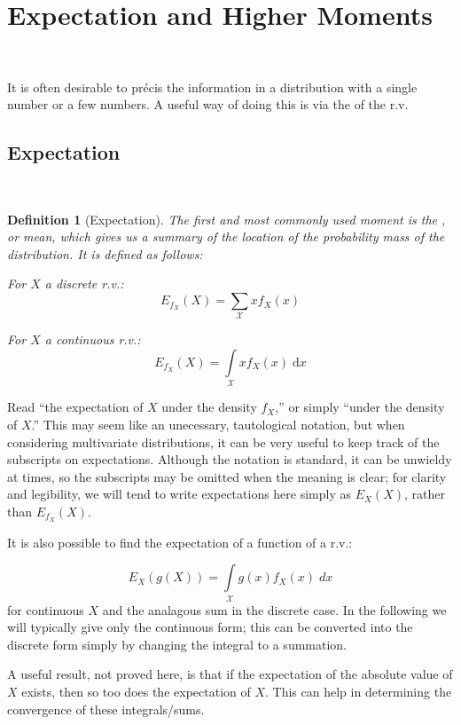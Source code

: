 \documentclass[12pt,a4paper]{article}
\newtheorem{defn}[thm]{Definition}
\newcommand{\uline}[1]{\underline{\smash{#1}}}
\begin{document}
\clearpage
\section{Expectation and Higher Moments}$\;$

It is often desirable to pr\'ecis the information in a distribution with a single number or a few numbers. A useful way of doing this is via the \uline{moments} of the r.v.

\subsection{Expectation}$\;$

\begin{defn}[Expectation]
\vspace{1cm}

The first and most commonly used moment is the \uline{expectation}, or mean, which gives us a summary of the location of the probability mass of the distribution. It is defined as follows:\par
\vspace{1cm}
\noindent For $X$ a discrete r.v.:
$$E_{f_X}(X) = \sum_{\mathcal{X}}x f_X(x)$$

\noindent For $X$ a continuous r.v.:
$$E_{f_X}(X) = \int\limits_{\mathcal{X}} x f_X(x)\; \mathrm{d}x$$

\end{defn}

Read ``the expectation of $X$ under the density $f_X$,'' or simply ``under the density of $X$.'' This may seem like an unecessary, tautological notation, but when considering multivariate distributions, it can be very useful to keep track of the subscripts on expectations. Although the notation is standard, it can be unwieldy at times, so the subscripts may be omitted when the meaning is clear; for clarity and legibility, we will tend to write expectations here simply as $E_X(X)$, rather than $E_{f_X}(X)$.

It is also possible to find the expectation of a function of a r.v.:

$$E_{X}(g(X)) = \int\limits_{\mathcal{X}} \!\!g(x) f_X(x)\; dx$$
for continuous $X$ and the analagous sum in the discrete case. In the following we will typically give only the continuous form; this can be converted into the discrete form simply by changing the integral to a summation.

A useful result, not proved here, is that if the expectation of the absolute value of $X$ exists, then so too does the expectation of $X$. This can help in determining the convergence of these integrals/sums.
\end{document}
